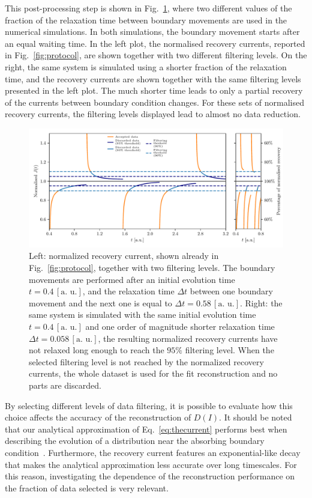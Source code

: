 {This post-processing step is shown in Fig.~\ref{fig:postprocessing}, where two different values of the fraction of the relaxation time between boundary movements are used in the numerical simulations. In both simulations, the boundary movement starts after an equal waiting time. In the left plot, the normalised recovery currents, reported in Fig.~\ref{fig:protocol}, are shown together with two different filtering levels. On the right, the same system is simulated using a shorter fraction of the relaxation time, and the recovery currents are shown together with the same filtering levels presented in the left plot. The much shorter time leads to only a partial recovery of the currents between boundary condition changes. For these sets of normalised recovery currents, the filtering levels displayed lead to almost no data reduction.
%
\begin{figure}[htp]
    \centering 
    \includegraphics[width=\textwidth]{4_probing_the_diffusive_behavior/figs/final/the_discarded_data.pdf}
    \caption{Left: normalized recovery current, shown already in Fig.~\ref{fig:protocol}, together with two filtering levels. The boundary movements are performed after an initial evolution time $t=0.4 \, [\text{a. u.}]$, and the relaxation time $\Delta t$ between one boundary movement and the next one is equal to $\Delta t=0.58 \, [\text{a. u.}]$. Right: the same system is simulated with the same initial evolution time $t=0.4 \, [\text{a. u.}]$ and one order of magnitude shorter relaxation time $\Delta t=0.058 \, [\text{a. u.}]$, the resulting normalized recovery currents have not relaxed long enough to reach the $95\%$ filtering level. When the selected filtering level is not reached by the normalized recovery currents, the whole dataset is used for the fit reconstruction and no parts are discarded.}
    \label{fig:postprocessing}
\end{figure}
%

By selecting different levels of data filtering, it is possible to evaluate how this choice affects the accuracy of the reconstruction of $D(I)$. It should be noted that our analytical approximation of Eq.~\eqref{eq:thecurrent} performs best when describing the evolution of a distribution near the absorbing boundary condition~\cite{montanari:ipac2021:tupab233}. Furthermore, the recovery current features an exponential-like decay that makes the analytical approximation less accurate over long timescales. For this reason, investigating the dependence of the reconstruction performance on the fraction of data selected is very relevant.

}
